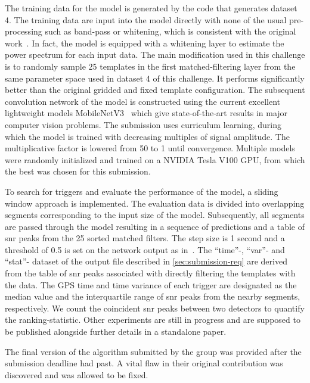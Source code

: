 The training data for the model is generated by the code that generates dataset 4. The training data are input into the model directly with none of the usual pre-processing such as band-pass or whitening, which is consistent with the original work~\cite{Wang:2019zaj}. In fact, the model is equipped with a whitening layer to estimate the power spectrum for each input data. The main modification used in this challenge is to randomly sample 25 templates in the first matched-filtering layer from the same parameter space used in dataset 4 of this challenge. It performs significantly better than the original gridded and fixed template configuration. The subsequent convolution network of the model is constructed using the current excellent lightweight models MobileNetV3~\cite{Howard:2019aaa} which give state-of-the-art results in major computer vision problems. The submission uses curriculum learning, during which the model is trained with decreasing multiples of signal amplitude. The multiplicative factor is lowered from 50 to 1 until convergence. Multiple models were randomly initialized and trained on a NVIDIA Tesla V100 GPU, from which the best was chosen for this submission.

To search for triggers and evaluate the performance of the model, a sliding window approach is implemented. The evaluation data is divided into overlapping segments corresponding to the input size of the model. Subsequently, all segments are passed through the model resulting in a sequence of predictions and a table of \acrshort{snr} peaks from the 25 sorted matched filters. The step size is 1 second and a threshold of 0.5 is set on the network output as in~\cite{Wang:2019zaj}. The ``time''-, ``var''- and ``stat''- dataset of the output file described in \autoref{sec:submission-req} are derived from the table of \acrshort{snr} peaks associated with directly filtering the templates with the data. The GPS time and time variance of each trigger are designated as the median value and the interquartile range of \acrshort{snr} peaks from the nearby segments, respectively. We count the coincident \acrshort{snr} peaks between two detectors to quantify the ranking-statistic. Other experiments are still in progress and are supposed to be published alongside further details in a standalone paper.

The final version of the algorithm submitted by the \mfcnn group was provided after the submission deadline had past. A vital flaw in their original contribution was discovered and was allowed to be fixed.


